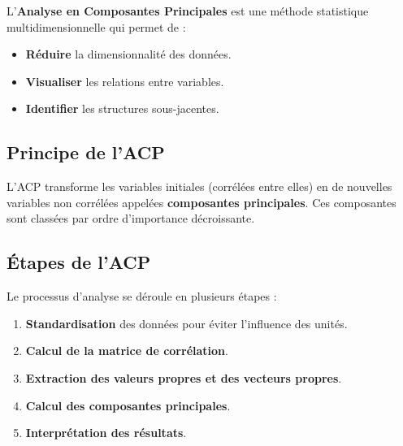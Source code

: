 \documentclass[12pt,a4paper]{book}
\begin{document}
	L'\textbf{Analyse en Composantes Principales} est une méthode statistique multidimensionnelle qui permet de :
	
	\begin{itemize}
		\item \textbf{Réduire} la dimensionnalité des données.
		\item \textbf{Visualiser} les relations entre variables.
		\item \textbf{Identifier} les structures sous-jacentes.
	\end{itemize}
	
	\subsection{Principe de l'ACP}
	
	L'ACP transforme les variables initiales (corrélées entre elles) en de nouvelles variables non corrélées appelées \textbf{composantes principales}. Ces composantes sont classées par ordre d'importance décroissante.
	
	\vspace{0.5cm}
	
	\begin{center}
	\end{center}
	
	\subsection{Étapes de l'ACP}
	
	Le processus d'analyse se déroule en plusieurs étapes :
	
	\begin{enumerate}
		\item \textbf{Standardisation} des données pour éviter l'influence des unités.
		\item \textbf{Calcul de la matrice de corrélation}.
		\item \textbf{Extraction des valeurs propres et des vecteurs propres}.
		\item \textbf{Calcul des composantes principales}.
		\item \textbf{Interprétation des résultats}.
	\end{enumerate}
	
\end{document}
